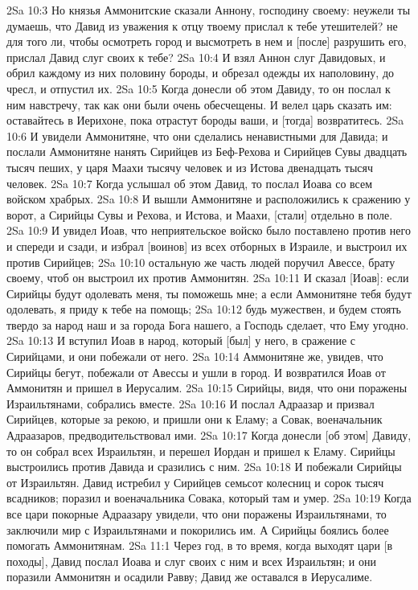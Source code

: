 2Sa 10:3  Но князья Аммонитские сказали Аннону, господину своему: неужели ты думаешь, что Давид из уважения к отцу твоему прислал к тебе утешителей? не для того ли, чтобы осмотреть город и высмотреть в нем и [после] разрушить его, прислал Давид слуг своих к тебе?
2Sa 10:4  И взял Аннон слуг Давидовых, и обрил каждому из них половину бороды, и обрезал одежды их наполовину, до чресл, и отпустил их.
2Sa 10:5  Когда донесли об этом Давиду, то он послал к ним навстречу, так как они были очень обесчещены. И велел царь сказать им: оставайтесь в Иерихоне, пока отрастут бороды ваши, и [тогда] возвратитесь.
2Sa 10:6  И увидели Аммонитяне, что они сделались ненавистными для Давида; и послали Аммонитяне нанять Сирийцев из Беф-Рехова и Сирийцев Сувы двадцать тысяч пеших, у царя Маахи тысячу человек и из Истова двенадцать тысяч человек.
2Sa 10:7  Когда услышал об этом Давид, то послал Иоава со всем войском храбрых.
2Sa 10:8  И вышли Аммонитяне и расположились к сражению у ворот, а Сирийцы Сувы и Рехова, и Истова, и Маахи, [стали] отдельно в поле.
2Sa 10:9  И увидел Иоав, что неприятельское войско было поставлено против него и спереди и сзади, и избрал [воинов] из всех отборных в Израиле, и выстроил их против Сирийцев;
2Sa 10:10  остальную же часть людей поручил Авессе, брату своему, чтоб он выстроил их против Аммонитян.
2Sa 10:11  И сказал [Иоав]: если Сирийцы будут одолевать меня, ты поможешь мне; а если Аммонитяне тебя будут одолевать, я приду к тебе на помощь;
2Sa 10:12  будь мужествен, и будем стоять твердо за народ наш и за города Бога нашего, а Господь сделает, что Ему угодно.
2Sa 10:13  И вступил Иоав в народ, который [был] у него, в сражение с Сирийцами, и они побежали от него.
2Sa 10:14  Аммонитяне же, увидев, что Сирийцы бегут, побежали от Авессы и ушли в город. И возвратился Иоав от Аммонитян и пришел в Иерусалим.
2Sa 10:15  Сирийцы, видя, что они поражены Израильтянами, собрались вместе.
2Sa 10:16  И послал Адраазар и призвал Сирийцев, которые за рекою, и пришли они к Еламу; а Совак, военачальник Адраазаров, предводительствовал ими.
2Sa 10:17  Когда донесли [об этом] Давиду, то он собрал всех Израильтян, и перешел Иордан и пришел к Еламу. Сирийцы выстроились против Давида и сразились с ним.
2Sa 10:18  И побежали Сирийцы от Израильтян. Давид истребил у Сирийцев семьсот колесниц и сорок тысяч всадников; поразил и военачальника Совака, который там и умер.
2Sa 10:19  Когда все цари покорные Адраазару увидели, что они поражены Израильтянами, то заключили мир с Израильтянами и покорились им. А Сирийцы боялись более помогать Аммонитянам.
2Sa 11:1  Через год, в то время, когда выходят цари [в походы], Давид послал Иоава и слуг своих с ним и всех Израильтян; и они поразили Аммонитян и осадили Равву; Давид же оставался в Иерусалиме.
